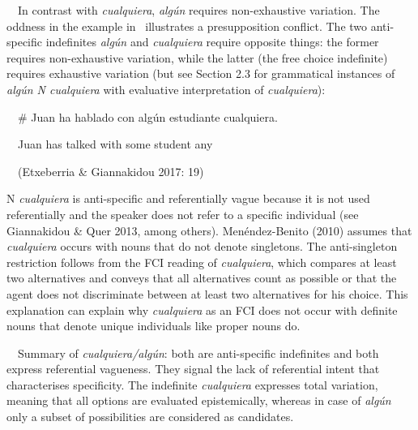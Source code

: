 \begin{styleStandard}
\ \ In contrast with \textit{cualquiera}, \textit{algún} requires non-exhaustive variation. The oddness in the example in \ illustrates a presupposition conflict. The two anti-specific indefinites \textit{algún} and \textit{cualquiera} require opposite things: the former requires non-exhaustive variation, while the latter (the free choice indefinite) requires exhaustive variation (but see Section 2.3 for grammatical instances of \textit{algún N cualquiera} with evaluative interpretation of \textit{cualquiera}):
\end{styleStandard}

\begin{styleStandard}
\label{bkm:Ref533761963}\ \ \# Juan ha hablado con algún estudiante cualquiera.
\end{styleStandard}

\begin{styleStandard}
\ \ Juan has talked with some student any 
\end{styleStandard}

\begin{styleStandard}
\ \ (Etxeberria \& Giannakidou 2017: 19)
\end{styleStandard}

\begin{styleStandard}
N \textit{cualquiera} is anti-specific and referentially vague because it is not used referentially and the speaker does not refer to a specific individual (see Giannakidou \& Quer 2013, among others). Menéndez-Benito (2010) assumes that \textit{cualquiera} occurs with nouns that do not denote singletons. The anti-singleton restriction follows from the FCI reading of \textit{cualquiera}, which compares at least two alternatives and conveys that all alternatives count as possible or that the agent does not discriminate between at least two alternatives for his choice. This explanation can explain why \textit{cualquiera} as an FCI does not occur with definite nouns that denote unique individuals like proper nouns do. 
\end{styleStandard}

\begin{styleStandard}
\ \ Summary of \textit{cualquiera/algún}: both are anti-specific indefinites and both express referential vagueness. They signal the lack of referential intent that characterises specificity. The indefinite \textit{cualquiera} expresses total variation, meaning that all options are evaluated epistemically, whereas in case of \textit{algún} only a subset of possibilities are considered as candidates. 
\end{styleStandard}

